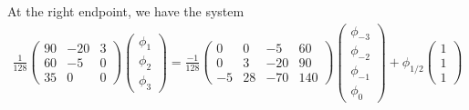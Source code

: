 \documentclass{article}
\begin{document}
At the right endpoint, we have the system
\begin{align*}
\frac{1}{128} \begin{pmatrix}
    90 & -20 & 3 \\
    60 & -5 & 0 \\
    35 & 0 & 0
\end{pmatrix}
\begin{pmatrix}
\phi_1 \\ \phi_2 \\ \phi_3
\end{pmatrix}
=
\frac{-1}{128} \begin{pmatrix}
    0 & 0 & -5 & 60 \\
    0 & 3 & -20 & 90 \\
    -5 & 28 & -70 & 140
\end{pmatrix}
\begin{pmatrix}
    \phi_{-3} \\ \phi_{-2} \\ \phi_{-1} \\ \phi_0
\end{pmatrix} + \phi_{1/2}\begin{pmatrix}
1 \\ 1 \\ 1
\end{pmatrix}
\end{align*}
\end{document}
